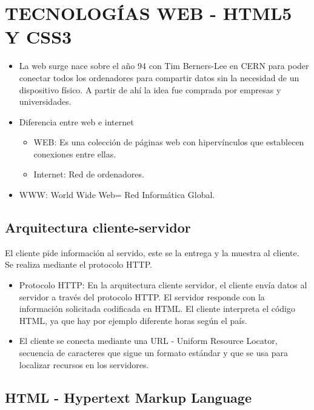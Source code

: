 \documentclass[12pt, twoside, openright]{report} %
\begin{document}
\chapter{TECNOLOGÍAS WEB - HTML5 Y CSS3}

\begin{itemize}
	\item La web surge nace sobre el año 94 con Tim Berners-Lee en CERN para
	      poder conectar todos los ordenadores para compartir datos sin la
	      necesidad de un dispositivo físico. A partir de ahí la idea fue
	      comprada por empresas y universidades.
	\item Diferencia entre web e internet

	      \begin{itemize}
		      \item WEB: Es una colección de páginas web con hipervínculos que
		            establecen conexiones entre ellas.

		      \item Internet: Red de ordenadores.
	      \end{itemize}
	\item WWW: World Wide Web= Red Informática Global.
\end{itemize}

\section{Arquitectura cliente-servidor}

El cliente pide información al servido, este se la entrega y la
muestra al cliente. Se realiza mediante el protocolo HTTP.

\begin{itemize}
	\item Protocolo HTTP: En la arquitectura cliente servidor, el cliente
	      envía datos al servidor a través del protocolo HTTP. El servidor
	      responde con la información solicitada codificada en HTML. El
	      cliente interpreta el código HTML, ya que hay por ejemplo diferente
	      horas según el país.
	\item El cliente se conecta mediante una URL - Uniform Resource Locator,
	      secuencia de caracteres que sigue un formato estándar y que se usa
	      para localizar recursos en los servidores.
\end{itemize}

\section{HTML - Hypertext Markup Language}
\end{document}
